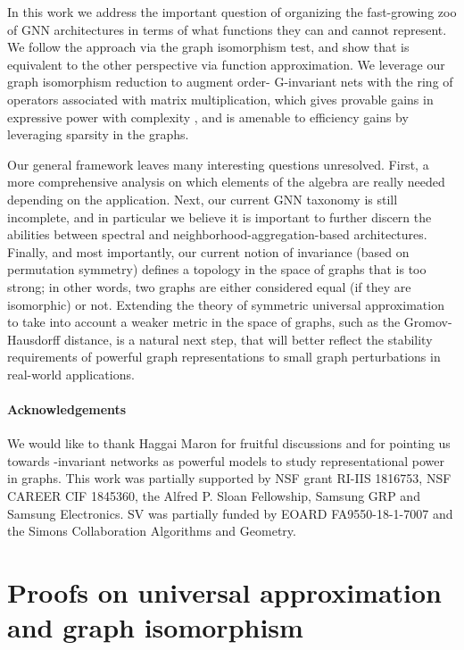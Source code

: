 \documentclass{article}
\begin{document}
In this work we address the important question of organizing the fast-growing zoo 
of GNN architectures in terms of what functions they can and cannot represent. 
We follow the approach via the graph isomorphism test, and show that is equivalent 
to the other perspective via function approximation. 
We leverage our graph isomorphism reduction to augment order- G-invariant nets 
with the ring of operators associated with matrix multiplication, which gives provable gains in expressive power with complexity , and is amenable to efficiency gains by leveraging sparsity in the graphs. 

Our general framework leaves many interesting questions unresolved. First, a more comprehensive analysis on which elements of the 
algebra are really needed depending on the application. Next, our current GNN taxonomy is still incomplete, and in particular we believe 
it is important to further discern the abilities between spectral and neighborhood-aggregation-based architectures. 
Finally, and most importantly, our current notion of invariance (based on permutation symmetry) defines a topology in the space of graphs that is too strong; in other words, two graphs are either considered equal (if they are isomorphic) or not. Extending the theory of symmetric universal 
approximation to take into account a weaker metric in the space of graphs, such as the Gromov-Hausdorff distance, is a natural next step, that will better reflect the stability requirements of powerful graph representations to small graph perturbations in real-world applications. 



\paragraph{Acknowledgements} We would like to thank Haggai Maron for fruitful discussions and for pointing us towards -invariant networks as powerful models to study representational power in graphs. 
This work was partially supported by NSF grant RI-IIS 1816753, NSF CAREER CIF 1845360, the Alfred P. Sloan Fellowship, Samsung GRP and Samsung Electronics.
SV was partially funded by EOARD FA9550-18-1-7007 and the Simons Collaboration Algorithms and Geometry. 












\newpage
\appendix
\section{Proofs on universal approximation and graph isomorphism}
\label{app.universal}
\end{document}
